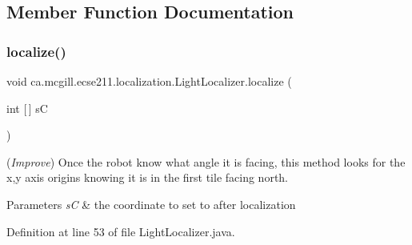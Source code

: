 \subsection{Member Function Documentation}
\mbox{\label{classca_1_1mcgill_1_1ecse211_1_1localization_1_1_light_localizer_a9fc3d6cdd897e9db86fc9d71dc914863}} 
\subsubsection{\texorpdfstring{localize()}{localize()}}
{\footnotesize\ttfamily void ca.\+mcgill.\+ecse211.\+localization.\+Light\+Localizer.\+localize (\begin{DoxyParamCaption}\item[{int \mbox{[}$\,$\mbox{]}}]{sC }\end{DoxyParamCaption})}

({\itshape Improve}) Once the robot know what angle it is facing, this method looks for the x,y axis origins knowing it is in the first tile facing north. 
\begin{DoxyParams}{Parameters}
{\em sC} & the coordinate to set to after localization \\
\hline
\end{DoxyParams}


Definition at line 53 of file Light\+Localizer.\+java.


